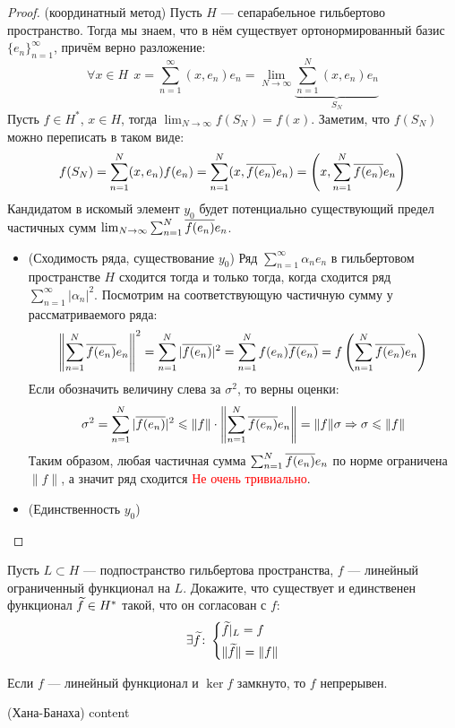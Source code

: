 \begin{proof} (координатный метод)
	Пусть $H$ --- сепарабельное гильбертово пространство. Тогда мы знаем, что в нём существует ортонормированный базис $\{e_n\}_{n = 1}^\infty$, причём верно разложение:
	\[
		\forall x \in H\ \ x = \sum_{n = 1}^\infty (x, e_n)e_n = \lim_{N \to \infty} \underbrace{\sum_{n = 1}^N (x, e_n)e_n}_{S_N}
	\]
	Пусть $f \in H^*$, $x \in H$, тогда $\lim_{N \to \infty} f(S_N) = f(x)$. Заметим, что $f(S_N)$ можно переписать в таком виде:
	\[
		f(S_N) = \sum_{n = 1}^N (x, e_n)f(e_n) = \sum_{n = 1}^N (x, \overline{f(e_n)}e_n) = \left(x, \sum_{n = 1}^N \overline{f(e_n)}e_n\right)
	\]
	Кандидатом в искомый элемент $y_0$ будет потенциально существующий предел частичных сумм $\lim_{N \to \infty} \sum_{n = 1}^N \overline{f(e_n)}e_n$.
	\begin{itemize}
		\item (Сходимость ряда, существование $y_0$) Ряд $\sum_{n = 1}^\infty \alpha_n e_n$ в гильбертовом пространстве $H$ сходится тогда и только тогда, когда сходится ряд $\sum_{n = 1}^\infty |\alpha_n|^2$. Посмотрим на соответствующую частичную сумму у рассматриваемого ряда:
		\[
			\left\|\sum_{n = 1}^N \overline{f(e_n)}e_n\right\|^2 = \sum_{n = 1}^N |\overline{f(e_n)}|^2 = \sum_{n = 1}^N f(e_n)\overline{f(e_n)} = f\left(\sum_{n = 1}^N \overline{f(e_n)}e_n\right)
		\]
		Если обозначить величину слева за $\sigma^2$, то верны оценки:
		\[
			\sigma^2 = \sum_{n = 1}^N |\overline{f(e_n)}|^2 \leqslant \|f\| \cdot \left\|\sum_{n = 1}^N \overline{f(e_n)}e_n\right\| = \|f\|\sigma \Rightarrow \sigma \leqslant \|f\|
		\]
		Таким образом, любая частичная сумма $\sum_{n = 1}^N \overline{f(e_n)}e_n$ по норме ограничена $\|f\|$, а значит ряд сходится \textcolor{red}{Не очень тривиально}.
		
		\item (Единственность $y_0$)
	\end{itemize}
\end{proof}

\begin{exercise}
	Пусть $L \subset H$ --- подпостранство гильбертова пространства, $f$ --- линейный ограниченный функционал на $L$. Докажите, что существует и единственен функционал $\widetilde{f} \in H^*$ такой, что он согласован с $f$:
	\[
		\exists \widetilde{f} \colon \left\{ \begin{aligned} 
			&{\widetilde{f}|_L = f}
			\\
			&{\|\widetilde{f}\| = \|f\|}
		 \end{aligned} \right.
	\]
\end{exercise}

\begin{exercise}
	Если $f$ --- линейный функционал и $\ker f$ замкнуто, то $f$ непрерывен.
\end{exercise}

\begin{theorem} (Хана-Банаха)
	content
\end{theorem}
